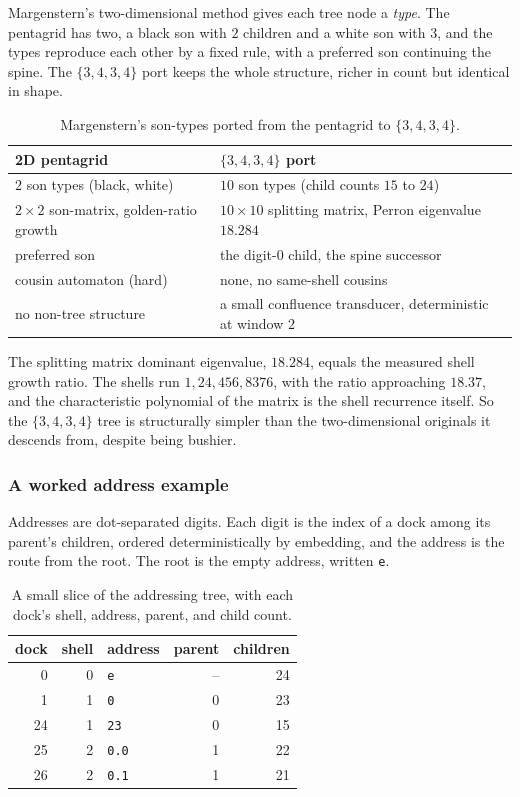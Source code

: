 Margenstern's two-dimensional method gives each tree node a \emph{type}. The pentagrid has two, a black son with $2$ children and a white son with $3$, and the types reproduce each other by a fixed rule, with a preferred son continuing the spine. The $\{3,4,3,4\}$ port keeps the whole structure, richer in count but identical in shape.

\begin{table}[ht]
\centering
\begin{tabular}{@{}ll@{}}
\toprule
2D pentagrid & $\{3,4,3,4\}$ port \\
\midrule
$2$ son types (black, white) & $10$ son types (child counts $15$ to $24$) \\
$2 \times 2$ son-matrix, golden-ratio growth & $10 \times 10$ splitting matrix, Perron eigenvalue $18.284$ \\
preferred son & the digit-$0$ child, the spine successor \\
cousin automaton (hard) & none, no same-shell cousins \\
no non-tree structure & a small confluence transducer, deterministic at window $2$ \\
\bottomrule
\end{tabular}
\caption{Margenstern's son-types ported from the pentagrid to $\{3,4,3,4\}$.}
\label{tab:sons-ported}
\end{table}

The splitting matrix dominant eigenvalue, $18.284$, equals the measured shell growth ratio. The shells run $1, 24, 456, 8376$, with the ratio approaching $18.37$, and the characteristic polynomial of the matrix is the shell recurrence itself. So the $\{3,4,3,4\}$ tree is structurally simpler than the two-dimensional originals it descends from, despite being bushier.

\subsubsection{A worked address example}

Addresses are dot-separated digits. Each digit is the index of a dock among its parent's children, ordered deterministically by embedding, and the address is the route from the root. The root is the empty address, written \texttt{e}.

\begin{table}[ht]
\centering
\begin{tabular}{@{}rrlrr@{}}
\toprule
dock & shell & address & parent & children \\
\midrule
0 & 0 & \texttt{e} & -- & 24 \\
1 & 1 & \texttt{0} & 0 & 23 \\
24 & 1 & \texttt{23} & 0 & 15 \\
25 & 2 & \texttt{0.0} & 1 & 22 \\
26 & 2 & \texttt{0.1} & 1 & 21 \\
\bottomrule
\end{tabular}
\caption{A small slice of the addressing tree, with each dock's shell, address, parent, and child count.}
\label{tab:address-example}
\end{table}

